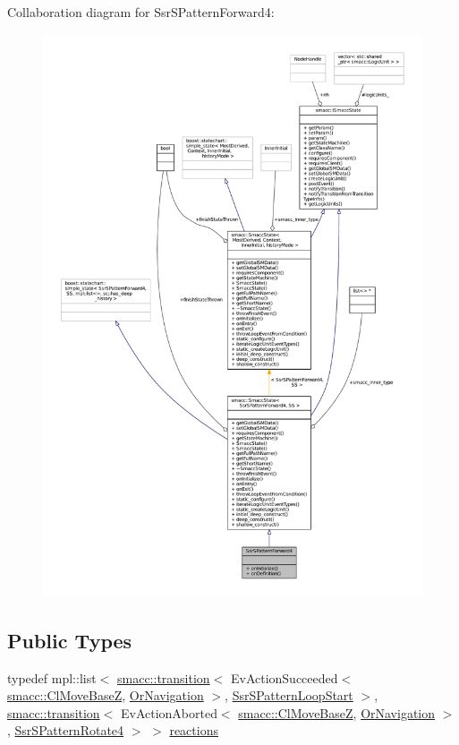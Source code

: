 Collaboration diagram for Ssr\+S\+Pattern\+Forward4\+:
\nopagebreak
\begin{figure}[H]
\begin{center}
\leavevmode
\includegraphics[width=350pt]{structSsrSPatternForward4__coll__graph}
\end{center}
\end{figure}
\subsection*{Public Types}
\begin{DoxyCompactItemize}
\item 
typedef mpl\+::list$<$ \hyperlink{classsmacc_1_1transition}{smacc\+::transition}$<$ Ev\+Action\+Succeeded$<$ \hyperlink{classsmacc_1_1ClMoveBaseZ}{smacc\+::\+Cl\+Move\+BaseZ}, \hyperlink{classOrNavigation}{Or\+Navigation} $>$, \hyperlink{structSsrSPatternLoopStart}{Ssr\+S\+Pattern\+Loop\+Start} $>$, \hyperlink{classsmacc_1_1transition}{smacc\+::transition}$<$ Ev\+Action\+Aborted$<$ \hyperlink{classsmacc_1_1ClMoveBaseZ}{smacc\+::\+Cl\+Move\+BaseZ}, \hyperlink{classOrNavigation}{Or\+Navigation} $>$, \hyperlink{structSsrSPatternRotate4}{Ssr\+S\+Pattern\+Rotate4} $>$ $>$ \hyperlink{structSsrSPatternForward4_adbf672343fe9065db27f75352f6db219}{reactions}
\end{DoxyCompactItemize}
